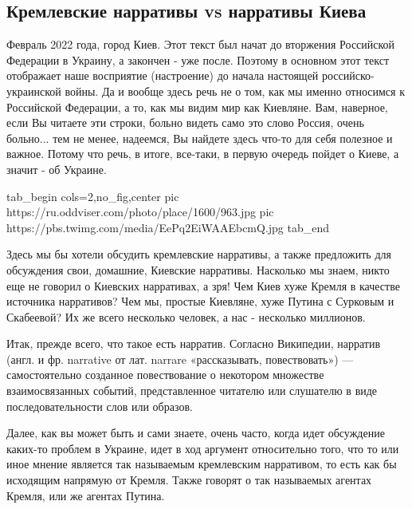  
 
 
 
 

\subsection{Кремлевские нарративы vs нарративы Киева}

Февраль 2022 года, город Киев. Этот текст был начат до вторжения Российской
Федерации в Украину, а закончен - уже после. Поэтому в основном этот текст
отображает наше восприятие (настроение) до начала настоящей
российско-украинской войны. Да и вообще здесь речь не о том, как мы именно
относимся к Российской Федерации, а то, как мы видим мир как Киевляне. Вам,
наверное, если Вы читаете эти строки, больно видеть само это слово Россия,
очень больно... тем не менее, надеемся, Вы найдете здесь что-то для себя
полезное и важное. Потому что речь, в итоге, все-таки, в первую очередь пойдет о Киеве,
а значит - об Украине.

\ifcmt
  tab_begin cols=2,no_fig,center
     pic https://ru.oddviser.com/photo/place/1600/963.jpg
		 pic https://pbs.twimg.com/media/EePq2EiWAAEbcmQ.jpg
  tab_end
\fi

Здесь мы бы хотели обсудить кремлевские нарративы, а также предложить для
обсуждения свои, домашние, Киевские нарративы. Насколько мы знаем, никто еще не
говорил о Киевских нарративах, а зря! Чем Киев хуже Кремля в качестве источника
нарративов? Чем мы, простые Киевляне, хуже Путина с Сурковым и Скабеевой? Их же
всего несколько человек, а нас - несколько миллионов.

Итак, прежде всего, что такое есть нарратив. Согласно Википедии, нарратив
(англ. и фр. narrative от лат. narrare «рассказывать, повествовать») —
самостоятельно созданное повествование о некотором множестве взаимосвязанных
событий, представленное читателю или слушателю в виде последовательности слов
или образов.

Далее, как вы может быть и сами знаете, очень часто, когда идет обсуждение
каких-то проблем в Украине, идет в ход аргумент относительно того, что то или
иное мнение является так называемым кремлевским нарративом, то есть как бы
исходящим напрямую от Кремля. Также говорят о так называемых агентах Кремля,
или же агентах Путина.

